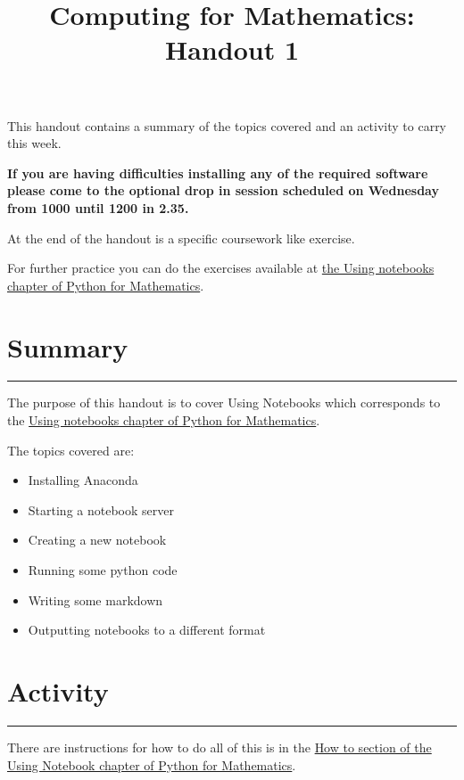 \documentclass{article}
\title{Computing for Mathematics: Handout 1}
\date{}
\begin{document}
\maketitle


This handout contains a summary of the topics covered and an activity to
carry this week.

\textbf{If you are having difficulties installing any of the required software
please come to the optional drop in session scheduled on Wednesday from 1000
until 1200 in 2.35.}

At the end of the handout is a specific coursework like exercise.

For further practice you can do the exercises available at 
\href{https://vknight.org/pfm/tools-for-mathematics/01-using-notebooks/exercises/main.html}{the Using
notebooks chapter of Python for Mathematics}.

\section{Summary}\label{summary}
\hrule


The purpose of this handout is to cover Using Notebooks which
corresponds to the
\href{https://vknight.org/pfm/tools-for-mathematics/01-using-notebooks/introduction/main.html}{Using
notebooks chapter of Python for Mathematics}.

The topics covered are:

\begin{itemize}
\item
  Installing Anaconda
\item
  Starting a notebook server
\item
  Creating a new notebook
\item
  Running some python code
\item
  Writing some markdown
\item
  Outputting notebooks to a different format
\end{itemize}


\section{Activity}\label{activity}
\hrule

There are instructions for how to do all of this is in the
\href{https://vknight.org/pfm/tools-for-mathematics/01-using-notebooks/how/}{How
to section of the Using Notebook chapter of Python for Mathematics}.
\end{document}
